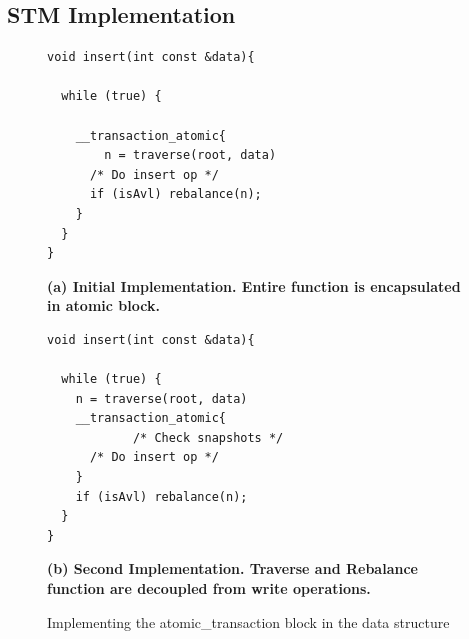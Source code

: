 \documentclass[conference]{IEEEtran}
\theoremstyle{definition}
\theoremstyle{theorem}
\begin{document}

\subsection{STM Implementation}
\begin{figure}[t]
 \centering
\begin{minipage}{0.49\textwidth}
\begin{lstlisting}
void insert(int const &data){

  while (true) {
  
    __transaction_atomic{
    	n = traverse(root, data)
      /* Do insert op */
      if (isAvl) rebalance(n);
    }
  }
}  
\end{lstlisting}
\textbf{(a) Initial Implementation. Entire function is encapsulated in atomic block.}
\end{minipage}
\begin{minipage}{0.49\textwidth}
{\begin{lstlisting}
void insert(int const &data){

  while (true) {
    n = traverse(root, data)
    __transaction_atomic{
			/* Check snapshots */
      /* Do insert op */
    }
   	if (isAvl) rebalance(n);
  }
}  
\end{lstlisting}
}
\textbf{(b) Second Implementation. Traverse and Rebalance function are decoupled from write operations.}
\end{minipage}
\caption{Implementing the atomic\_transaction block in the data structure}
\end{figure}
\end{document}
